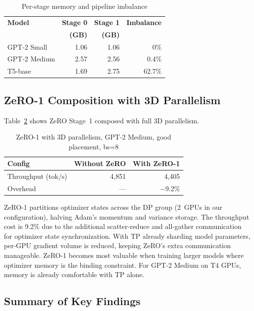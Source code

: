 \documentclass[conference]{IEEEtran}
\begin{document}
\begin{table}[h]
\centering
\caption{Per-stage memory and pipeline imbalance}
\label{tab:imbalance}
\small
\begin{tabular}{lrrr}
\toprule
\textbf{Model} & \textbf{Stage 0} & \textbf{Stage 1} & \textbf{Imbalance} \\
 & \textbf{(GB)} & \textbf{(GB)} & \\
\midrule
GPT-2 Small & 1.06 & 1.06 & 0\% \\
GPT-2 Medium & 2.57 & 2.56 & 0.4\% \\
T5-base & 1.69 & 2.75 & 62.7\% \\
\bottomrule
\end{tabular}
\end{table}

\subsection{ZeRO-1 Composition with 3D Parallelism}

Table~\ref{tab:zero} shows ZeRO Stage~1 composed with full 3D parallelism.

\begin{table}[h]
\centering
\caption{ZeRO-1 with 3D parallelism, GPT-2 Medium, good placement, bs=8}
\label{tab:zero}
\small
\begin{tabular}{lrr}
\toprule
\textbf{Config} & \textbf{Without ZeRO} & \textbf{With ZeRO-1} \\
\midrule
Throughput (tok/s) & 4,851 & 4,405 \\
Overhead & --- & $-$9.2\% \\
\bottomrule
\end{tabular}
\end{table}

ZeRO-1 partitions optimizer states across the DP group (2~GPUs in our configuration), halving Adam's momentum and variance storage. The throughput cost is 9.2\% due to the additional scatter-reduce and all-gather communication for optimizer state synchronization. With TP already sharding model parameters, per-GPU gradient volume is reduced, keeping ZeRO's extra communication manageable. ZeRO-1 becomes most valuable when training larger models where optimizer memory is the binding constraint. For GPT-2 Medium on T4 GPUs, memory is already comfortable with TP alone.

\subsection{Summary of Key Findings}
\end{document}
